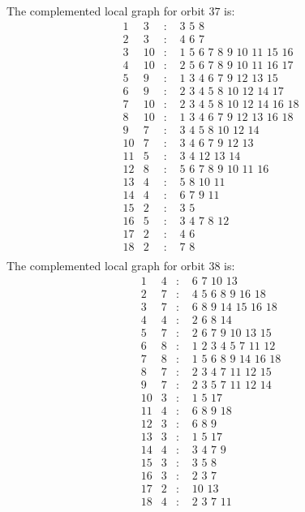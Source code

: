 \documentclass[12pt]{article}
\begin{document}
The complemented local graph for orbit $37$ is:
\begin{equation*}
\begin{array}{rrcl}
1&3&:&\,\,3\,\,5\,\,8\\
2&3&:&\,\,4\,\,6\,\,7\\
3&10&:&\,\,1\,\,5\,\,6\,\,7\,\,8\,\,9\,\,10\,\,11\,\,15\,\,16\\
4&10&:&\,\,2\,\,5\,\,6\,\,7\,\,8\,\,9\,\,10\,\,11\,\,16\,\,17\\
5&9&:&\,\,1\,\,3\,\,4\,\,6\,\,7\,\,9\,\,12\,\,13\,\,15\\
6&9&:&\,\,2\,\,3\,\,4\,\,5\,\,8\,\,10\,\,12\,\,14\,\,17\\
7&10&:&\,\,2\,\,3\,\,4\,\,5\,\,8\,\,10\,\,12\,\,14\,\,16\,\,18\\
8&10&:&\,\,1\,\,3\,\,4\,\,6\,\,7\,\,9\,\,12\,\,13\,\,16\,\,18\\
9&7&:&\,\,3\,\,4\,\,5\,\,8\,\,10\,\,12\,\,14\\
10&7&:&\,\,3\,\,4\,\,6\,\,7\,\,9\,\,12\,\,13\\
11&5&:&\,\,3\,\,4\,\,12\,\,13\,\,14\\
12&8&:&\,\,5\,\,6\,\,7\,\,8\,\,9\,\,10\,\,11\,\,16\\
13&4&:&\,\,5\,\,8\,\,10\,\,11\\
14&4&:&\,\,6\,\,7\,\,9\,\,11\\
15&2&:&\,\,3\,\,5\\
16&5&:&\,\,3\,\,4\,\,7\,\,8\,\,12\\
17&2&:&\,\,4\,\,6\\
18&2&:&\,\,7\,\,8\\
\end{array}
\end{equation*}
The complemented local graph for orbit $38$ is:
\begin{equation*}
\begin{array}{rrcl}
1&4&:&\,\,6\,\,7\,\,10\,\,13\\
2&7&:&\,\,4\,\,5\,\,6\,\,8\,\,9\,\,16\,\,18\\
3&7&:&\,\,6\,\,8\,\,9\,\,14\,\,15\,\,16\,\,18\\
4&4&:&\,\,2\,\,6\,\,8\,\,14\\
5&7&:&\,\,2\,\,6\,\,7\,\,9\,\,10\,\,13\,\,15\\
6&8&:&\,\,1\,\,2\,\,3\,\,4\,\,5\,\,7\,\,11\,\,12\\
7&8&:&\,\,1\,\,5\,\,6\,\,8\,\,9\,\,14\,\,16\,\,18\\
8&7&:&\,\,2\,\,3\,\,4\,\,7\,\,11\,\,12\,\,15\\
9&7&:&\,\,2\,\,3\,\,5\,\,7\,\,11\,\,12\,\,14\\
10&3&:&\,\,1\,\,5\,\,17\\
11&4&:&\,\,6\,\,8\,\,9\,\,18\\
12&3&:&\,\,6\,\,8\,\,9\\
13&3&:&\,\,1\,\,5\,\,17\\
14&4&:&\,\,3\,\,4\,\,7\,\,9\\
15&3&:&\,\,3\,\,5\,\,8\\
16&3&:&\,\,2\,\,3\,\,7\\
17&2&:&\,\,10\,\,13\\
18&4&:&\,\,2\,\,3\,\,7\,\,11\\
\end{array}
\end{equation*}
\end{document}
